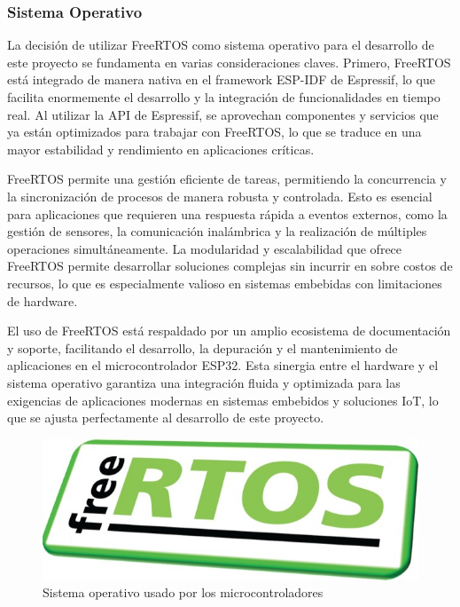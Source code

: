 \subsubsection{Sistema Operativo}

La decisión de utilizar FreeRTOS como sistema operativo para el desarrollo de este proyecto se fundamenta en varias consideraciones claves. Primero, FreeRTOS está integrado de manera nativa en el framework ESP-IDF de Espressif, lo que facilita enormemente el desarrollo y la integración de funcionalidades en tiempo real. Al utilizar la API de Espressif, se aprovechan componentes y servicios que ya están optimizados para trabajar con FreeRTOS, lo que se traduce en una mayor estabilidad y rendimiento en aplicaciones críticas.

FreeRTOS permite una gestión eficiente de tareas, permitiendo la concurrencia y la sincronización de procesos de manera robusta y controlada. Esto es esencial para aplicaciones que requieren una respuesta rápida a eventos externos, como la gestión de sensores, la comunicación inalámbrica y la realización de múltiples operaciones simultáneamente. La modularidad y escalabilidad que ofrece FreeRTOS permite desarrollar soluciones complejas sin incurrir en sobre costos de recursos, lo que es especialmente valioso en sistemas embebidas con limitaciones de hardware. \cite{barry2016mastering}

El uso de FreeRTOS está respaldado por un amplio ecosistema de documentación y soporte, facilitando el desarrollo, la depuración y el mantenimiento de aplicaciones en el microcontrolador ESP32. Esta sinergia entre el hardware y el sistema operativo garantiza una integración fluida y optimizada para las exigencias de aplicaciones modernas en sistemas embebidos y soluciones IoT, lo que se ajusta perfectamente al desarrollo de este proyecto.

\begin{figure}[H]
  \centering
  \includegraphics[width=0.4\linewidth]{images/freertos.jpg}
  \caption{Sistema operativo usado por los microcontroladores}
  \label{fig:sistema_operativo}
\end{figure}